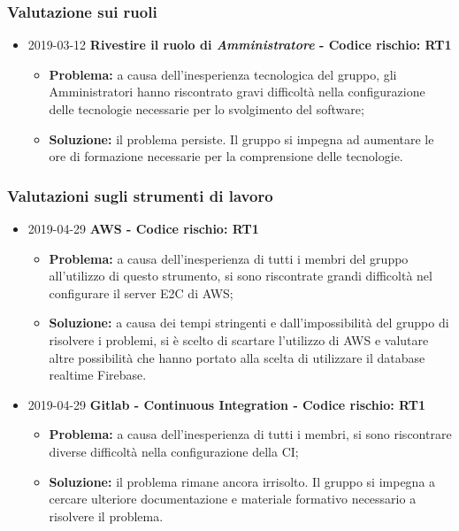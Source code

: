 \subsubsection{Valutazione sui ruoli}

\begin{itemize}
\item 2019-03-12 \textbf{Rivestire il ruolo di \textit{Amministratore} - Codice rischio: RT1} \\
		\begin{itemize}
			\item \textbf{Problema:} a causa dell'inesperienza tecnologica del gruppo, gli Amministratori hanno riscontrato gravi difficoltà nella configurazione delle tecnologie necessarie per lo svolgimento del software;
			\item \textbf{Soluzione:} il problema persiste. Il gruppo si impegna ad aumentare le ore di formazione necessarie per la comprensione delle tecnologie.
		\end{itemize}	
		
		
\end{itemize}
\subsubsection{Valutazioni sugli strumenti di lavoro}
\begin{itemize}
				
		\item 2019-04-29 \textbf{AWS - Codice rischio: RT1} \\
		\begin{itemize}
			\item \textbf{Problema:} a causa dell'inesperienza di tutti i membri del gruppo all'utilizzo di questo strumento, si sono riscontrate grandi difficoltà nel configurare il server E2C di AWS;
			\item \textbf{Soluzione:} a causa dei tempi stringenti e dall'impossibilità del gruppo di risolvere i problemi, si è scelto di scartare l'utilizzo di AWS e valutare altre possibilità che hanno portato alla scelta di utilizzare il database realtime Firebase.
		\end{itemize}		
		\item 2019-04-29 \textbf{Gitlab - Continuous Integration - Codice rischio: RT1} \\
		\begin{itemize}
			\item \textbf{Problema:} a causa dell'inesperienza di tutti i membri, si sono riscontrare diverse difficoltà nella configurazione della CI;
			\item \textbf{Soluzione:} il problema rimane ancora irrisolto. Il gruppo si impegna a cercare ulteriore documentazione e materiale formativo necessario a risolvere il problema.
		\end{itemize}
\end{itemize}